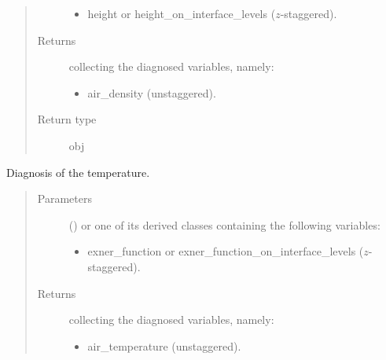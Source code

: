 \documentclass[letterpaper,10pt,english]{sphinxmanual}
\begin{document}
\begin{fulllineitems}
\begin{fulllineitems}
\begin{quote}
\begin{description}
\begin{itemize}
\item {} 
height or height\_on\_interface\_levels (\(z\)-staggered).

\end{itemize}


\item[{Returns}] \leavevmode

{\hyperref[\detokenize{api:storages.grid_data.GridData}]{}} collecting the diagnosed variables, namely:
\begin{itemize}
\item {} 
air\_density (unstaggered).

\end{itemize}


\item[{Return type}] \leavevmode
obj

\end{description}\end{quote}

\end{fulllineitems}


\begin{fulllineitems}
\label{\detokenize{api:dycore.diagnostic_isentropic.DiagnosticIsentropic.get_air_temperature}}
Diagnosis of the temperature.
\begin{quote}\begin{description}
\item[{Parameters}] \leavevmode
{} () \textendash{} 
{\hyperref[\detokenize{api:storages.grid_data.GridData}]{}} or one of its derived classes containing the following variables:
\begin{itemize}
\item {} 
exner\_function or exner\_function\_on\_interface\_levels (\(z\)-staggered).

\end{itemize}


\item[{Returns}] \leavevmode

{\hyperref[\detokenize{api:storages.grid_data.GridData}]{}} collecting the diagnosed variables, namely:
\begin{itemize}
\item {} 
air\_temperature (unstaggered).


\end{itemize}
\end{description}
\end{quote}
\end{fulllineitems}
\end{fulllineitems}
\end{document}
